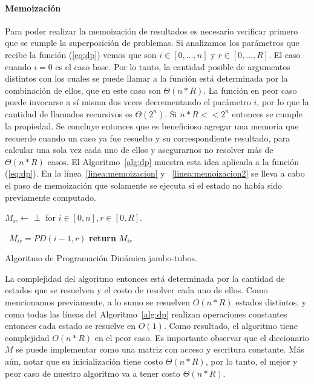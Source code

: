 \documentclass[10pt,a4paper]{article}
\begin{document}
\paragraph{Memoización}
Para poder realizar la memoización de resultados es necesario verificar primero que se cumple la superposición de problemas. Si analizamos los parámetros que recibe la función (\ref{eq:dp}) vemos que son $i \in [0, \hdots, n]$ y $r \in [0, \hdots, R]$. El caso cuando $i = 0$ es el caso base. Por lo tanto, la cantidad posible de argumentos distintos con los cuales se puede llamar a la función está determinada por la combinación de ellos, que en este caso son $\Theta(n * R)$. La función en peor caso puede invocarse a sí misma dos veces decrementando el parámetro $i$, por lo que la cantidad de llamados recursivos es $\Theta(2^n)$. Si $n*R << 2^n$ entonces se cumple la propiedad. 
Se concluye entonces que es beneficioso agregar una memoria que recuerde cuando un caso ya fue resuelto y su correspondiente resultado, para calcular una sola vez cada uno de ellos y asegurarnos no resolver más de $\Theta(n * R)$ casos. El Algoritmo~\ref{alg:dp} muestra esta idea aplicada a la función (\ref{eq:dp}). En la línea~\ref{linea:memoizacion} y ~\ref{linea:memoizacion2} se lleva a cabo el paso de memoización que solamente se ejecuta si el estado no había sido previamente computado.

\begin{algorithm}
\begin{algorithmic}[1]
\State $M_{ir} \gets \perp $ for $i \in [0, n], r \in [0, R]$.
    	
    	\
    		$M_{ir} = PD(i-1,r)$
    	\EndIf\label{linea:memoizacion2}
    \EndIf
    \label{linea:memoizacion}
    \State \textbf{return} $M_{ir}$
\EndFunction
\end{algorithmic}
\caption{Algoritmo de Programación Dinámica jambo-tubos.}
\label{alg:dp}
\end{algorithm}

La complejidad del algoritmo entonces está determinada por la cantidad de estados que se resuelven y el costo de resolver cada uno de ellos. Como mencionamos previamente, a lo sumo se resuelven $O(n * R)$ estados distintos, y como todas las líneas del Algoritmo~\ref{alg:dp} realizan operaciones constantes entonces cada estado se resuelve en $O(1)$. Como resultado, el algoritmo tiene complejidad $O(n*R)$ en el peor caso. Es importante observar que el diccionario $M$ se puede implementar como una matriz con acceso y escritura constante. Más aún, notar que su inicialización tiene costo $\Theta(n*R)$, por lo tanto, el mejor y peor caso de nuestro algoritmo va a tener costo $\Theta(n*R)$.
\end{document}
